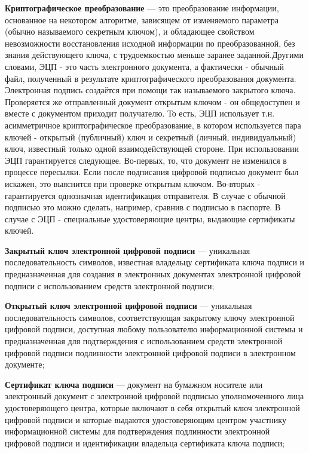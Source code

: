 \textbf{Криптографическое преобразование } --- это преобразование информации,
основанное на некотором алгоритме, зависящем от изменяемого параметра (обычно
называемого секретным ключом), и обладающее свойством невозможности
восстановления исходной информации по преобразованной, без знания
действующего ключа, с трудоемкостью меньше заранее заданной.Другими словами,
ЭЦП - это часть электронного документа, а фактически - обычный файл,
полученный в результате криптографического преобразования  документа.
Электронная подпись создаётся при помощи так называемого закрытого ключа.
Проверяется же отправленный документ открытым ключом - он общедоступен и
вместе с документом приходит получателю. То есть, ЭЦП использует т.н.
асимметричное криптографическое преобразование, в котором используется пара
ключей - открытый (публичный) ключ и секретный (личный, индивидуальный) ключ,
известный только одной взаимодействующей стороне. При использовании ЭЦП
гарантируется следующее. Во-первых, то, что документ не изменился в процессе
пересылки. Если после подписания цифровой подписью документ был искажен, это
выяснится при проверке открытым ключом. Во-вторых - гарантируется однозначная
идентификация отправителя. В случае с обычной подписью это можно сделать,
например, сравнив с подписью в паспорте. В случае с ЭЦП - специальные
удостоверяющие центры, выдающие сертификаты ключей.

\textbf{Закрытый ключ электронной цифровой подписи} --- уникальная
последовательность символов, известная владельцу сертификата ключа подписи и
предназначенная для создания в электронных документах электронной цифровой
подписи с использованием средств электронной  подписи;

\textbf{Открытый ключ электронной цифровой подписи} --- уникальная
последовательность символов, соответствующая закрытому ключу электронной
цифровой подписи, доступная любому пользователю информационной системы и
предназначенная для подтверждения с использованием средств электронной
цифровой подписи подлинности электронной цифровой подписи в электронном
документе;

\textbf{Сертификат ключа подписи} --- документ на бумажном носителе или
электронный документ с электронной цифровой подписью уполномоченного лица
удостоверяющего центра, которые включают в себя открытый ключ электронной
цифровой подписи и которые выдаются удостоверяющим центром участнику
информационной системы для подтверждения подлинности электронной цифровой
подписи и идентификации владельца сертификата ключа подписи;

